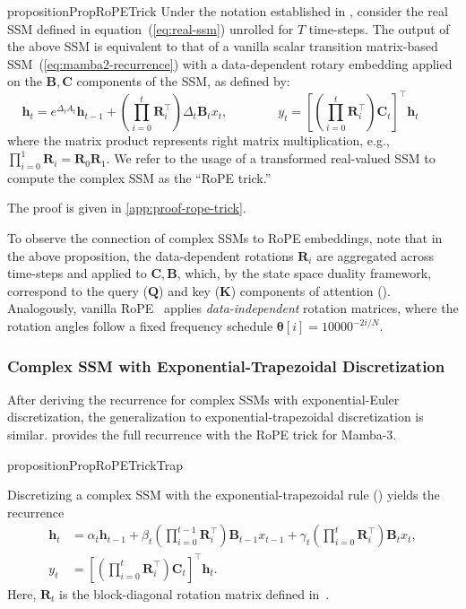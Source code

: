 \documentclass{article}
\newcommand{\citep}{\parencite}
\def\eqref#1{equation~(\ref{#1})}
\def\plaineqref#1{(\ref{#1})}
\def\vh{{\bm{h}}}
\def\bB{{\bm{B}}}
\def\bC{{\bm{C}}}
\def\bK{{\bm{K}}}
\def\bQ{{\bm{Q}}}
\def\bR{{\bm{R}}}
\theoremstyle{plain}
\theoremstyle{definition}
\theoremstyle{remark}
\begin{document}
\begin{restatable}{proposition}{PropRoPETrick}\label{prop:rope-trick} 
Under the notation established in , consider the real SSM defined in \eqref{eq:real-ssm} unrolled for $T$ time-steps.
The output of the above SSM is equivalent to that of a vanilla scalar transition matrix-based SSM~\plaineqref{eq:mamba2-recurrence} with a data-dependent rotary embedding applied on the $\bB,\bC$ components of the SSM, as defined by:
\begin{equation}
    \vh_t = e^{\Delta_tA_t}\vh_{t-1} + \left( \prod_{i=0}^t \bR^\top_i \right) \Delta_t\bB_tx_t, \qquad \qquad
    y_t = \left[\left( \prod_{i=0}^t \bR^\top_i \right)\bC_t\right]^\top\vh_t \qquad
\end{equation}
where the matrix product represents right matrix multiplication, e.g., $\prod_{i=0}^1\bR_i = \bR_0 \bR_1$. 
We refer to the usage of a transformed real-valued SSM to compute the complex SSM as the ``RoPE trick.''
\end{restatable}
The proof is given in \cref{app:proof-rope-trick}.

To observe the connection of complex SSMs to RoPE embeddings, note that in the above proposition, the data-dependent rotations $\bR_i$ are aggregated across time-steps and applied to $\bC,\bB$, which, by the state space duality framework, correspond to the query ($\bQ$) and key ($\bK$) components of attention (). 
Analogously, vanilla RoPE~\citep{su2023roformerenhancedtransformerrotary} applies \emph{data-independent} rotation matrices, where the rotation angles follow a fixed frequency schedule $\boldsymbol{\theta}[i] = 10000^{-2i/N}$. 

\subsubsection{Complex SSM with Exponential-Trapezoidal Discretization}

After deriving the recurrence for complex SSMs with exponential-Euler discretization, the generalization to exponential-trapezoidal discretization is similar.
 provides the full recurrence with the RoPE trick for Mamba-3.

\begin{restatable}{proposition}{PropRoPETrickTrap}\label{prop:rope-trick-trap}

Discretizing a complex SSM with the exponential-trapezoidal rule () yields the recurrence
\begin{align}
    \vh_t 
    &= \alpha_t \vh_{t-1} 
    + \beta_t \left(\prod_{i=0}^{t-1} \bR_i^\top \right)\bB_{t-1} x_{t-1} 
    + \gamma_t \left(\prod_{i=0}^t \bR_i^\top \right)\bB_t x_t, \nonumber \\
    y_t
    &= \left[\left(\prod_{i=0}^t \bR_i^\top\right)\bC_t\right]^\top \vh_t .
\end{align}
Here, $\bR_t$ is the block-diagonal rotation matrix defined in~.
\end{restatable}
\end{document}
